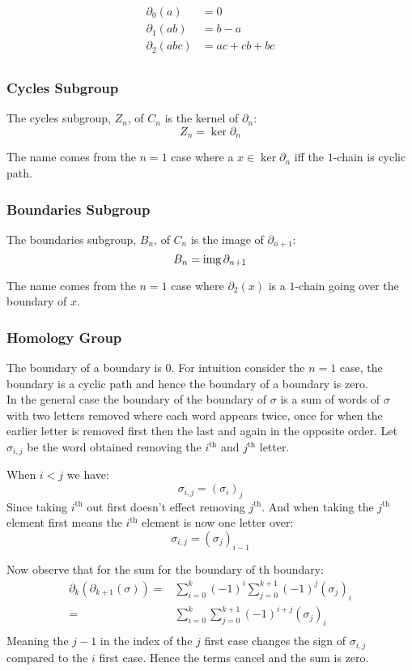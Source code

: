 \begin{equation*}
\begin{aligned}
	\partial_0(a) &= 0\\
	\partial_1(ab) &= b-a\\
	\partial_2(abc) &= ac + cb + bc\\
\end{aligned}
\end{equation*}

\subsubsection{Cycles Subgroup}
The cycles subgroup, $Z_n$, of $C_n$ is the kernel of $\partial_n$:
\[ Z_n = \ker\partial_n\]

The name comes from the $n=1$ case where a $x\in\ker\partial_n$ iff the $1$-chain is cyclic path.

\subsubsection{Boundaries Subgroup}
The boundaries subgroup, $B_n$, of $C_n$ is the image of $\partial_{n+1}$:
\[ B_n = \operatorname{img}\partial_{n+1}\]

The name comes from the $n=1$ case where $\partial_2(x)$ is a $1$-chain going over the boundary of $x$.

\subsubsection{Homology Group}
The boundary of a boundary is $0$.
For intuition consider the $n=1$ case,
the boundary is a cyclic path and hence the boundary of a boundary is zero.
\\

In the general case the boundary of the boundary of $\sigma$ is a sum of words of $\sigma$ with two letters removed where each word appears twice,
once for when the earlier letter is removed first then the last and again in the opposite order.
Let $\sigma_{i,j}$ be the word obtained removing the $i^\text{th}$ and $j^\text{th}$ letter.

When $i< j$ we have:
\[\sigma_{i,j} = (\sigma_i)_j\]
Since taking $i^\text{th}$ out first doesn't effect removing $j^\text{th}$.
And when taking the $j^\text{th}$ element first means the $i^\text{th}$ element is now one letter over:
\[\sigma_{i,j} = (\sigma_j)_{i-1}\]

Now observe that for the sum for the boundary of th boundary:
\begin{equation*}
\begin{aligned}
	\partial_k(\partial_{k+1}(\sigma)) =& \sum_{i=0}^{k}(-1)^i\sum_{j=0}^{k+1}(-1)^j(\sigma_j)_i\\
	=& \sum_{i=0}^{k}\sum_{j=0}^{k+1}(-1)^{i+j}(\sigma_j)_i\\
\end{aligned}
\end{equation*}
Meaning the $j-1$ in the index of the $j$ first case changes the sign of $\sigma_{i,j}$ compared to the $i$ first case.
Hence the terms cancel and the sum is zero.
\\

